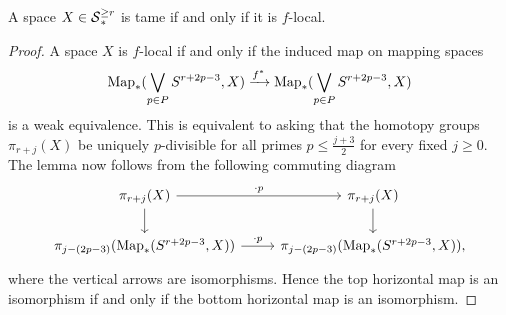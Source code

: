 \begin{lemma}
\label{tame is equivalent to f-local}
	A space $X\in \operatorname{\mathcal{S}}_{*}^{\geq r}$ is tame if and only if it is $f$-local.
\end{lemma}
\begin{proof}
	A space $X$ is $f$-local if and only if the induced map on mapping spaces
	\[
	\operatorname{Map}_{*}(\bigvee_{p\in P}S^{r+2p-3},X) \xrightarrow{f^*} \operatorname{Map}_{*}(\bigvee_{p\in P}S^{r+2p-3},X)
	\]
	is a weak equivalence. This is equivalent to asking that the homotopy groups $\pi_{r+j}(X)$ be uniquely $p$-divisible for all primes $p\leq \frac{j+3}{2}$ for every fixed $j\geq 0$. 	The lemma now follows from the following commuting diagram
	\[	
	\begin{tikzcd}
		\pi_{r+j}(X) & \pi_{r+j}(X)\\
		\pi_{j-(2p-3)}(\map_*(S^{r+2p-3},X)) & \pi_{j-(2p-3)}(\map_*(S^{r+2p-3},X)),
		\arrow[from=1-1, to=1-2,"\cdot p"]
		\arrow[from=2-1, to=2-2,"\cdot p"]
		\arrow[from=1-1, to=2-1]
		\arrow[from=1-2, to=2-2]
	\end{tikzcd}
	\]
	where the vertical arrows are isomorphisms. Hence the top horizontal map is an isomorphism if and only if the bottom horizontal map is an isomorphism.
	
\end{proof}

